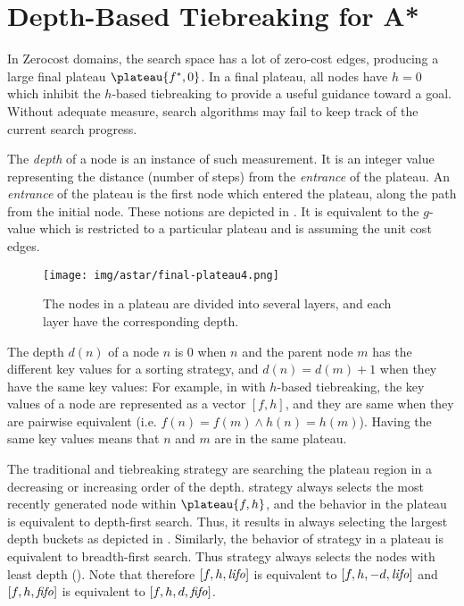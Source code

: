 \section{Depth-Based Tiebreaking for A*}

\label{sec:depth}

In Zerocost domains, the search space has a lot of zero-cost edges,
producing a large final plateau $\plateau{f^*,0}$. In a final plateau,
all nodes have $h=0$ which inhibit the $h$-based tiebreaking to provide
a useful guidance toward a goal. Without adequate measure, search
algorithms may fail to keep track of the current search progress.

The \emph{depth} of a node is an instance of such measurement.  It is an
integer value representing the distance (number of steps) from the
\emph{entrance} of the plateau.  An \emph{entrance} of the plateau is
the first node which entered the plateau, along the path from the
initial node. These notions are depicted in
. It is equivalent to the $g$-value which is
restricted to a particular plateau and is assuming the unit cost edges.

\begin{figure}[htbp]
 \centering
 \texttt{[image: img/astar/final-plateau4.png]}
 \caption{The nodes in a plateau are divided into several layers,
 and each layer have the corresponding depth.}
 \label{fig:plateau-depiction}
\end{figure}

The depth $d(n)$ of a
node $n$ is 0 when $n$ and the parent node $m$ has the different key
values for a sorting strategy, and $d(n)=d(m)+1$ when they have the same
key values: For example, in \astar with $h$-based tiebreaking, the key
values of a node are represented as a vector $[f,h]$, and they are same
when they are pairwise equivalent (i.e. $f(n) = f(m) \land h(n) =
h(m)$).  Having the same key values means that $n$ and $m$ are in the
same plateau. 

The traditional \lifo and \fifo tiebreaking strategy are
searching the plateau region in a decreasing or increasing order of the depth.
\lifo strategy always selects the most recently generated node
within $\plateau{f,h}$, and the behavior in the plateau is equivalent to depth-first search.
Thus, it results in always selecting the largest depth
buckets as depicted in .
Similarly, the behavior of \fifo strategy 
in a plateau is equivalent to breadth-first search. Thus \fifo strategy
always selects the nodes with least depth ().
Note that therefore $[f,h,{\text{\textit{lifo}}}]$ is equivalent to $[f,h,-d,{\text{\textit{lifo}}}]$ and
$[f,h,{\text{\textit{fifo}}}]$ is equivalent to $[f,h,d,{\text{\textit{fifo}}}]$.

